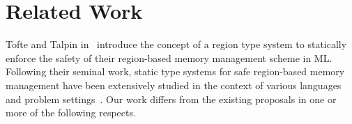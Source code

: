 \section{Related Work}
\label{sec:related-work}


Tofte and Talpin in~\cite{tofte93,tofte94,tofte97} introduce the
concept of a region type system to statically enforce the safety of
their region-based memory management scheme in ML. Following their
seminal work, static type systems for safe region-based memory
management have been extensively studied in the context of various
languages and problem settings~\cite{cyclone02, cyclone04, yates99,
MIT03, DPJ09, HMN01, WW01, rust, gpu14}. Our work differs from the
existing proposals in one or more of the following respects.

